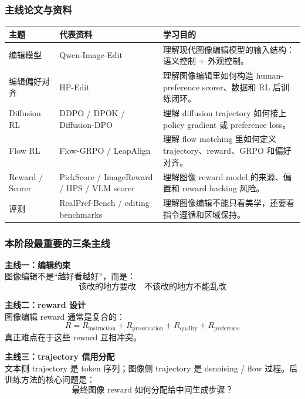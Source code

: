 \subsubsection{主线论文与资料}

\begin{center}
{\small
\begin{tabular}{p{3cm}p{4.8cm}p{5cm}}
\hline
\textbf{主题} & \textbf{代表资料} & \textbf{学习目的} \\
\hline
编辑模型
&
Qwen-Image-Edit
&
理解现代图像编辑模型的输入结构：语义控制 + 外观控制。
\\
编辑偏好对齐
&
HP-Edit
&
理解图像编辑里如何构造 human-preference scorer、数据和 RL 后训练闭环。
\\
Diffusion RL
&
DDPO / DPOK / Diffusion-DPO
&
理解 diffusion trajectory 如何接上 policy gradient 或 preference loss。
\\
Flow RL
&
Flow-GRPO / LeapAlign
&
理解 flow matching 里如何定义 trajectory、reward、GRPO 和偏好对齐。
\\
Reward / Scorer
&
PickScore / ImageReward / HPS / VLM scorer
&
理解图像 reward model 的来源、偏置和 reward hacking 风险。
\\
评测
&
RealPref-Bench / editing benchmarks
&
理解图像编辑不能只看美学，还要看指令遵循和区域保持。
\\
\hline
\end{tabular}
}
\end{center}

\subsubsection{本阶段最重要的三条主线}

\begin{summarybox}
\textbf{主线一：编辑约束}\\
图像编辑不是“越好看越好”，而是：
\[
\text{该改的地方要改}
\quad
\text{不该改的地方不能乱改}
\]
\end{summarybox}

\begin{summarybox}
\textbf{主线二：reward 设计}\\
图像编辑 reward 通常是复合的：
\[
R
=
R_\text{instruction}
+
R_\text{preservation}
+
R_\text{quality}
+
R_\text{preference}
\]
真正难点在于这些 reward 互相冲突。
\end{summarybox}

\begin{summarybox}
\textbf{主线三：trajectory 信用分配}\\
文本侧 trajectory 是 token 序列；图像侧 trajectory 是 denoising / flow 过程。后训练方法的核心问题是：
\[
\text{最终图像 reward 如何分配给中间生成步骤？}
\]
\end{summarybox}

